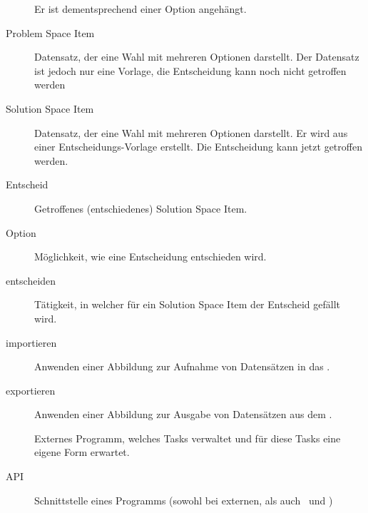 \begin{description}
				Er ist dementsprechend einer Option angehängt.
			\item[Problem Space Item] Datensatz, der eine Wahl mit mehreren Optionen darstellt.
				Der Datensatz ist jedoch nur eine Vorlage, 
				die Entscheidung kann noch nicht getroffen werden
			\item[Solution Space Item] Datensatz, der eine Wahl mit mehreren Optionen darstellt.
				Er wird aus einer Entscheidungs-Vorlage erstellt.
				Die Entscheidung kann jetzt getroffen werden.
			\item[Entscheid] Getroffenes (entschiedenes) Solution Space Item.
			\item[Option] Möglichkeit, wie eine Entscheidung entschieden wird.
			\item[entscheiden] Tätigkeit, 
				in welcher für ein Solution Space Item der Entscheid gefällt wird.
			\item[importieren] Anwenden einer Abbildung zur Aufnahme von Datensätzen in das \eeppi.
			\item[exportieren] Anwenden einer Abbildung zur Ausgabe von Datensätzen aus dem \eeppi.
			\item[\ppt] Externes Programm, 
				welches Tasks verwaltet und für diese Tasks eine eigene Form erwartet.
			\item[API] Schnittstelle eines Programms (sowohl bei externen, als auch \cdar\ und \eeppi)
		\end{description}

